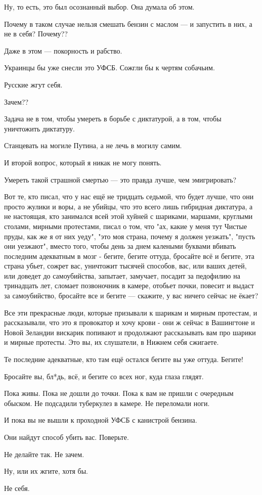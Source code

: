 Ну, то есть, это был осознанный выбор. Она думала об этом.

Почему в таком случае нельзя смешать бензин с маслом --- и запустить в них, а не
в себя? Почему??

Даже в этом --- покорность и рабство.

Украинцы бы уже снесли это УФСБ. Сожгли бы к чертям собачьим.

Русские жгут себя.

Зачем??

Задача не в том, чтобы умереть в борьбе с диктатурой, а в том, чтобы уничтожить
диктатуру.

Станцевать на могиле Путина, а не лечь в могилу самим.

И второй вопрос, который я никак не могу понять.

Умереть такой страшной смертью --- это правда лучше, чем эмигрировать?

Вот те, кто писал, что у нас ещё не тридцать седьмой, что будет лучше, что они
просто жулики и воры, а не убийцы, что это всего лишь гибридная диктатура, а не
настоящая, кто занимался всей этой хуйней с шариками, маршами, круглыми
столами, мирными протестами, писал о том, что "ах, какие у меня тут Чистые
пруды, как же я от них уеду", "это моя страна, почему я должен уезжать", "пусть
они уезжают", вместо того, чтобы день за днем калеными буквами вбивать
последним адекватным в мозг - бегите, бегите оттуда, бросайте всё и бегите, эта
страна убьет, сожрет вас, уничтожит тысячей способов, вас, или ваших детей, или
доведет до самоубийства, запытает, замучает, посадит за педофилию на тринадцать
лет, сломает позвоночник в камере, отобьет почки, повесит и выдаст за
самоубийство, бросайте все и бегите --- скажите, у вас ничего сейчас не ёкает?

Все эти прекрасные люди, которые призывали к шарикам и мирным протестам, и
рассказывали, что это я провокатор и хочу крови - они ж сейчас в Вашингтоне и
Новой Зеландии вискарик попивают и продолжают рассказывать вам про шарики и
мирные протесты. Это вы, их слушатели, в Нижнем себя сжигаете.

Те последние адекватные, кто там ещё остался бегите вы уже оттуда. Бегите!

Бросайте вы, бл*дь, всё, и бегите со всех ног, куда глаза глядят.

Пока живы. Пока не дошли до точки. Пока к вам не пришли с очередным обыском. Не
подсадили туберкулез в камере. Не переломали ноги.

И пока вы не вышли к проходной УФСБ с канистрой бензина.

Они найдут способ убить вас. Поверьте.

Не делайте так. Не зачем.

Ну, или их жгите, хотя бы.

Не себя.
